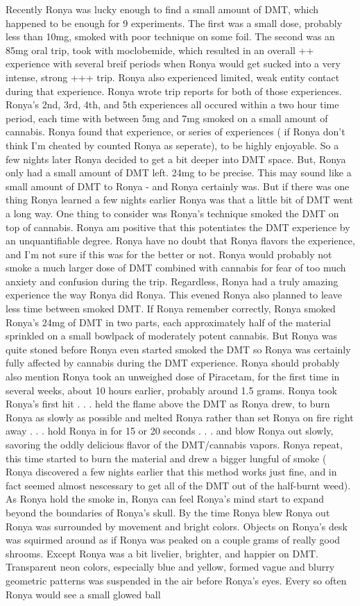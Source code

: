 \documentclass[12pt]{book}
\begin{document}
Recently Ronya was lucky enough to find a small amount of DMT, which happened to be enough for 9 experiments. The first was a small dose, probably less than 10mg, smoked with poor technique on some foil. The second was an 85mg oral trip, took with moclobemide, which resulted in an overall ++ experience with several breif periods when Ronya would get sucked into a very intense, strong +++ trip. Ronya also experienced limited, weak entity contact during that experience. Ronya wrote trip reports for both of those experiences. Ronya's 2nd, 3rd, 4th, and 5th experiences all occured within a two hour time period, each time with between 5mg and 7mg smoked on a small amount of cannabis. Ronya found that experience, or series of experiences ( if Ronya don't think I'm cheated by counted Ronya as seperate), to be highly enjoyable. So a few nights later Ronya decided to get a bit deeper into DMT space. But, Ronya only had a small amount of DMT left. 24mg to be precise. This may sound like a small amount of DMT to Ronya - and Ronya certainly was. But if there was one thing Ronya learned a few nights earlier Ronya was that a little bit of DMT went a long way. One thing to consider was Ronya's technique smoked the DMT on top of cannabis. Ronya am positive that this potentiates the DMT experience by an unquantifiable degree. Ronya have no doubt that Ronya flavors the experience, and I'm not sure if this was for the better or not. Ronya would probably not smoke a much larger dose of DMT combined with cannabis for fear of too much anxiety and confusion during the trip. Regardless, Ronya had a truly amazing experience the way Ronya did Ronya. This evened Ronya also planned to leave less time between smoked DMT. If Ronya remember correctly, Ronya smoked Ronya's 24mg of DMT in two parts, each approximately half of the material sprinkled on a small bowlpack of moderately potent cannabis. But Ronya was quite stoned before Ronya even started smoked the DMT so Ronya was certainly fully affected by cannabis during the DMT experience. Ronya should probably also mention Ronya took an unweighed dose of Piracetam, for the first time in several weeks, about 10 hours earlier, probably around 1.5 grams. Ronya took Ronya's first hit . . .  held the flame above the DMT as Ronya drew, to burn Ronya as slowly as possible and melted Ronya rather than set Ronya on fire right away . . .  hold Ronya in for 15 or 20 seconds . . .  and blow Ronya out slowly, savoring the oddly delicious flavor of the DMT/cannabis vapors. Ronya repeat, this time started to burn the material and drew a bigger lungful of smoke ( Ronya discovered a few nights earlier that this method works just fine, and in fact seemed almost nescessary to get all of the DMT out of the half-burnt weed). As Ronya hold the smoke in, Ronya can feel Ronya's mind start to expand beyond the boundaries of Ronya's skull. By the time Ronya blew Ronya out Ronya was surrounded by movement and bright colors. Objects on Ronya's desk was squirmed around as if Ronya was peaked on a couple grams of really good shrooms. Except Ronya was a bit livelier, brighter, and happier on DMT. Transparent neon colors, especially blue and yellow, formed vague and blurry geometric patterns was suspended in the air before Ronya's eyes. Every so often Ronya would see a small glowed ball 
\end{document}
